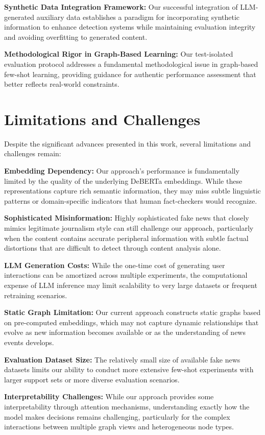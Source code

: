 \textbf{Synthetic Data Integration Framework:} Our successful integration of LLM-generated auxiliary data establishes a paradigm for incorporating synthetic information to enhance detection systems while maintaining evaluation integrity and avoiding overfitting to generated content.

\textbf{Methodological Rigor in Graph-Based Learning:} Our test-isolated evaluation protocol addresses a fundamental methodological issue in graph-based few-shot learning, providing guidance for authentic performance assessment that better reflects real-world constraints.

\section{Limitations and Challenges}

Despite the significant advances presented in this work, several limitations and challenges remain:

\textbf{Embedding Dependency:} Our approach's performance is fundamentally limited by the quality of the underlying DeBERTa embeddings. While these representations capture rich semantic information, they may miss subtle linguistic patterns or domain-specific indicators that human fact-checkers would recognize.

\textbf{Sophisticated Misinformation:} Highly sophisticated fake news that closely mimics legitimate journalism style can still challenge our approach, particularly when the content contains accurate peripheral information with subtle factual distortions that are difficult to detect through content analysis alone.

\textbf{LLM Generation Costs:} While the one-time cost of generating user interactions can be amortized across multiple experiments, the computational expense of LLM inference may limit scalability to very large datasets or frequent retraining scenarios.

\textbf{Static Graph Limitation:} Our current approach constructs static graphs based on pre-computed embeddings, which may not capture dynamic relationships that evolve as new information becomes available or as the understanding of news events develops.

\textbf{Evaluation Dataset Size:} The relatively small size of available fake news datasets limits our ability to conduct more extensive few-shot experiments with larger support sets or more diverse evaluation scenarios.

\textbf{Interpretability Challenges:} While our approach provides some interpretability through attention mechanisms, understanding exactly how the model makes decisions remains challenging, particularly for the complex interactions between multiple graph views and heterogeneous node types.

